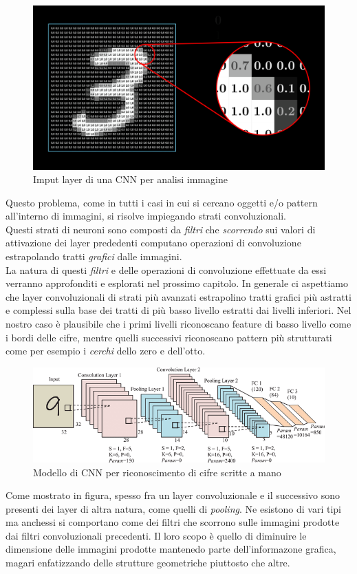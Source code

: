 \documentclass[12pt,a4paper,openright,twoside]{report}
\begin{document}
\begin{figure}[h]
\centering
\includegraphics[width=\linewidth]{pixel-values.png}
\caption{Imput layer di una CNN per analisi immagine}
\end{figure}
Questo problema, come in tutti i casi in cui si cercano oggetti e/o pattern all'interno di immagini, si risolve impiegando strati convoluzionali. \\
Questi strati di neuroni sono composti da \emph{filtri} che \emph{scorrendo} sui valori di attivazione dei layer prededenti computano operazioni di convoluzione estrapolando tratti \emph{grafici} dalle immagini.\\
La natura di questi \emph{filtri} e delle operazioni di convoluzione effettuate da essi verranno approfonditi e esplorati nel prossimo capitolo. 
In generale ci aspettiamo che layer convoluzionali di strati più avanzati estrapolino tratti grafici più astratti e complessi sulla base dei tratti di più basso livello estratti dai livelli inferiori. Nel nostro caso è plausibile che i primi livelli riconoscano feature di basso livello come i bordi delle cifre, mentre quelli successivi riconoscano pattern più strutturati come per esempio i \emph{cerchi} dello zero e dell'otto. 
\newpage

\begin{figure}[h]
\centering
\includegraphics[width=\linewidth]{digit_arch.png}
\caption{Modello di CNN per riconoscimento di cifre scritte a mano}
\end{figure}
Come mostrato in figura, spesso fra un layer convoluzionale e il successivo sono presenti dei layer di altra natura, come quelli di \emph{pooling}. Ne esistono di vari tipi ma anchessi si comportano come dei filtri che scorrono sulle immagini prodotte dai filtri convoluzionali precedenti. Il loro scopo è quello di diminuire le dimensione delle immagini prodotte mantenedo parte dell'informazone grafica, magari enfatizzando delle strutture geometriche piuttosto che altre.
\end{document}

